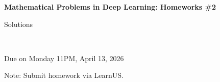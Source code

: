 \documentclass[12pt]{article}
\begin{document}
\begin{center}
{\bf Mathematical Problems in Deep Learning: Homeworks \#2 \begin{solution}Solutions\end{solution}}\\ \medskip
\begin{problem}Due on Monday 11PM, April 13, 2026 \end{problem}
\end{center}

\begin{problem}
\noindent 
Note: Submit homework via LearnUS.
\end{problem}

\begin{solution}
\end{solution}
\end{document}
